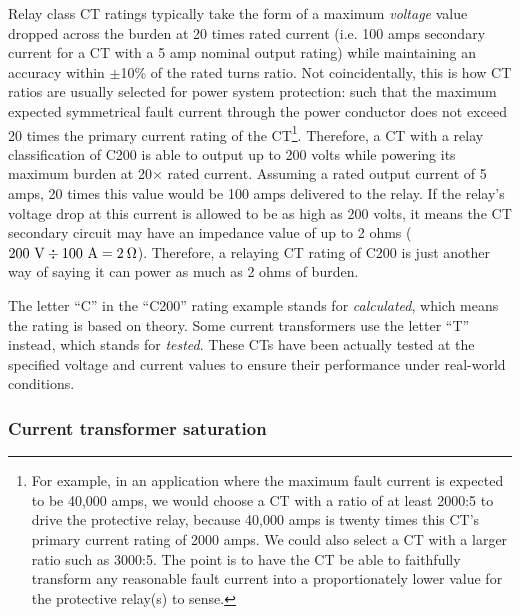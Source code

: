 Relay class CT ratings typically take the form of a maximum \textit{voltage} value dropped across the burden at 20 times rated current (i.e. 100 amps secondary current for a CT with a 5 amp nominal output rating) while maintaining an accuracy within $\pm$10\% of the rated turns ratio.  Not coincidentally, this is how CT ratios are usually selected for power system protection: such that the maximum expected symmetrical fault current through the power conductor does not exceed 20 times the primary current rating of the CT\footnote{For example, in an application where the maximum fault current is expected to be 40,000 amps, we would choose a CT with a ratio of at least 2000:5 to drive the protective relay, because 40,000 amps is twenty times this CT's primary current rating of 2000 amps.  We could also select a CT with a larger ratio such as 3000:5.  The point is to have the CT be able to faithfully transform any reasonable fault current into a proportionately lower value for the protective relay(s) to sense.}.  Therefore, a CT with a relay classification of C200 is able to output up to 200 volts while powering its maximum burden at 20$\times$ rated current.  Assuming a rated output current of 5 amps, 20 times this value would be 100 amps delivered to the relay.  If the relay's voltage drop at this current is allowed to be as high as 200 volts, it means the CT secondary circuit may have an impedance value of up to 2 ohms ($200 \hbox{ V} \div 100 \hbox{ A} = 2 \> \Omega$).  Therefore, a relaying CT rating of C200 is just another way of saying it can power as much as 2 ohms of burden.

The letter ``C'' in the ``C200'' rating example stands for \textit{calculated}, which means the rating is based on theory.  Some current transformers use the letter ``T'' instead, which stands for \textit{tested}.  These CTs have been actually tested at the specified voltage and current values to ensure their performance under real-world conditions.









\filbreak
\subsubsection{Current transformer saturation}

